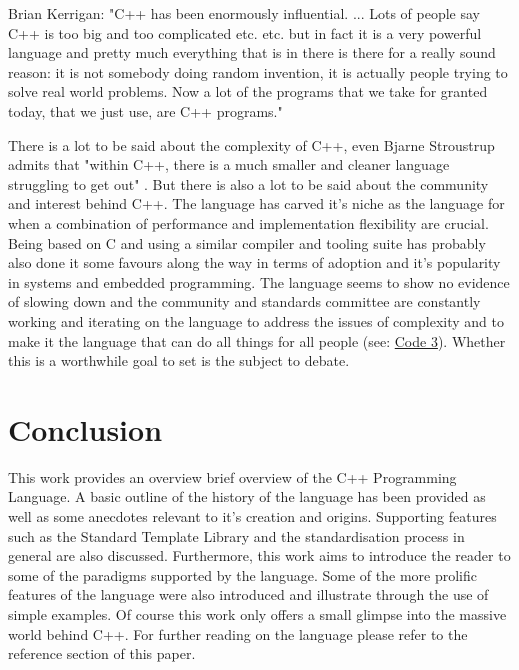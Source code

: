 \documentclass[conference, a4paper]{IEEEtran}
\begin{document}
Brian Kerrigan:
"C++ has been enormously influential. ... Lots of people say C++ is too big and too complicated etc. etc. but in fact it is a very powerful language and pretty much everything that is in there is there for a really sound reason: it is not somebody doing random invention, it is actually people trying to solve real world problems. Now a lot of the programs that we take for granted today, that we just use, are C++ programs." \cite{bkcomputerphile}

There is a lot to be said about the complexity of C++, even Bjarne Stroustrup admits that "within C++, there is a much smaller and cleaner language struggling to get out" \cite{cppquotes}. But there is also a lot to be said about the community and interest behind C++. The language has carved it's niche as the language for when a combination of performance and implementation flexibility are crucial. Being based on C and using a similar compiler and tooling suite has probably also done it some favours along the way in terms of adoption and it's popularity in systems and embedded programming. The language seems to show no evidence of slowing down and the community and standards committee are constantly working and iterating on the language to address the issues of complexity and to make it the language that can do all things for all people (see: \hyperref[listing:3]{Code 3}). Whether this is a worthwhile goal to set is the subject to debate. 

\section{Conclusion}

This work provides an overview brief overview of the C++ Programming Language. A basic outline of the history of the language has been provided as well as some anecdotes relevant to it's creation and origins. Supporting features such as the Standard Template Library and the standardisation process in general are also discussed. Furthermore, this work aims to introduce the reader to some of the paradigms supported by the language. Some of the more prolific features of the language were also introduced and illustrate through the use of simple examples. Of course this work only offers a small glimpse into the massive world behind C++. For further reading on the language please refer to the reference section of this paper.




\phantom{\cite{*}}

\end{document}
